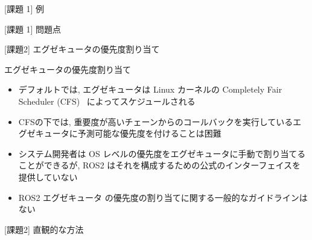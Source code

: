 \begin{frame}{[課題 1] 例}
\end{frame}

\begin{frame}{[課題 1] 問題点}
\end{frame}

\begin{frame}{[課題2] エグゼキュータの優先度割り当て}
    \begin{block}{エグゼキュータの優先度割り当て}
      \setlength{\linewidth}{0.98\columnwidth}
      \begin{itemize}
        \item デフォルトでは, エグゼキュータは Linux カーネルの Completely Fair Scheduler (CFS)~\cite{wong2008fairness} によってスケジュールされる
        \item CFSの下では, 重要度が高いチェーンからのコールバックを実行しているエグゼキュータに予測可能な優先度を付けることは困難
        \item システム開発者は OS レベルの優先度をエグゼキュータに手動で割り当てることができるが, ROS2 はそれを構成するための公式のインターフェイスを提供していない
        \item ROS2 エグゼキュータ の優先度の割り当てに関する一般的なガイドラインはない
      \end{itemize}
    \end{block}
\end{frame}

\begin{frame}{[課題2] 直観的な方法}
\end{frame}

